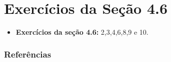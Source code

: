 \documentclass[12pt]{beamer}
\begin{document}
\section{Exercícios da Seção 4.6}
\begin{frame}{\Home}
\begin{block}{}
\justifying

\begin{itemize}
    \item \textbf{Exercícios da seção 4.6:} 2,3,4,6,8,9 e 10.
\end{itemize}
\nocite{hogg}
\end{block}
\end{frame}

\begin{frame}[allowframebreaks]
\frametitle{\bf Referências}
\printbibliography[heading=none]
\end{frame}
\end{document}
